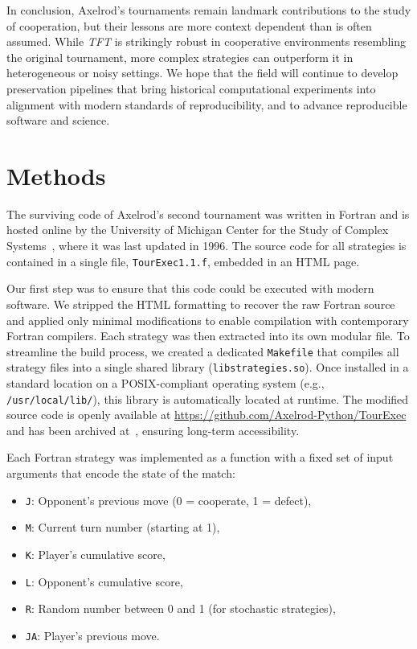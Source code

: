 \documentclass{article}
\newcommand{\TFT}{\emph{TFT}}
\begin{document}
In conclusion, Axelrod's tournaments remain landmark contributions to the study
of cooperation, but their lessons are more context dependent than is often assumed.
While \TFT{} is strikingly robust in cooperative
environments resembling the original tournament, more complex strategies can
outperform it in heterogeneous or noisy settings. We hope that the field will
continue to develop preservation pipelines that bring historical computational
experiments into alignment with modern standards of reproducibility, and to
advance reproducible software and science.

\section*{Methods}

The surviving code of Axelrod's second tournament was written in Fortran and is
hosted online by the University of Michigan Center for the Study of Complex
Systems~\cite{Axelrod1980bCode}, where it was last updated in 1996. The source
code for all strategies is contained in a single file, \texttt{TourExec1.1.f},
embedded in an HTML page.

Our first step was to ensure that this code could be executed with modern
software. We stripped the HTML formatting to recover the raw Fortran source and
applied only minimal modifications to enable compilation with contemporary
Fortran compilers. Each strategy was then extracted into its own modular file.
To streamline the build process, we created a dedicated \texttt{Makefile} that
compiles all strategy files into a single shared library
(\texttt{libstrategies.so}). Once installed in a standard location on a
POSIX-compliant operating system (e.g., \texttt{/usr/local/lib/}), this library
is automatically located at runtime. The modified source code is openly
available at \url{https://github.com/Axelrod-Python/TourExec} and has been
archived at~\cite{TourExec}, ensuring long-term accessibility.

Each Fortran strategy was implemented as a function with a fixed set of input
arguments that encode the state of the match:

\begin{itemize}
    \item \texttt{J}: Opponent's previous move (0 = cooperate, 1 = defect),
    \item \texttt{M}: Current turn number (starting at 1),
    \item \texttt{K}: Player's cumulative score,
    \item \texttt{L}: Opponent's cumulative score,
    \item \texttt{R}: Random number between 0 and 1 (for stochastic strategies),
    \item \texttt{JA}: Player's previous move.
\end{itemize}
\end{document}
